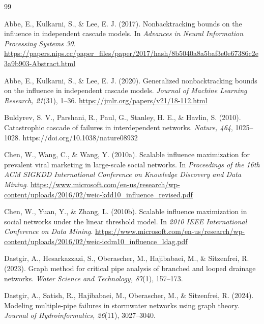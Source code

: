 \renewcommand{\refname}{REFERENCES}
\setlength{\bibsep}{0.5\baselineskip}
\setlength{\bibhang}{1.25cm}

\begin{thebibliography}{99}

Abbe, E., Kulkarni, S., \& Lee, E. J. (2017). Nonbacktracking bounds on the influence in independent cascade models. In \textit{Advances in Neural Information Processing Systems 30}. \url{https://papers.nips.cc/paper_files/paper/2017/hash/8b5040a8a5baf3e0e67386c2e3a9b903-Abstract.html}

Abbe, E., Kulkarni, S., \& Lee, E. J. (2020). Generalized nonbacktracking bounds on the influence in independent cascade models. \textit{Journal of Machine Learning Research, 21}(31), 1--36. \url{https://jmlr.org/papers/v21/18-112.html}

Buldyrev, S. V., Parshani, R., Paul, G., Stanley, H. E., \& Havlin, S. (2010). Catastrophic cascade of failures in interdependent networks. \textit{Nature, 464}, 1025--1028. https://doi.org/10.1038/nature08932

Chen, W., Wang, C., \& Wang, Y. (2010a). Scalable influence maximization for prevalent viral marketing in large-scale social networks. In \textit{Proceedings of the 16th ACM SIGKDD International Conference on Knowledge Discovery and Data Mining}. \url{https://www.microsoft.com/en-us/research/wp-content/uploads/2016/02/weic-kdd10_influence_revised.pdf}

Chen, W., Yuan, Y., \& Zhang, L. (2010b). Scalable influence maximization in social networks under the linear threshold model. In \textit{2010 IEEE International Conference on Data Mining}. \url{https://www.microsoft.com/en-us/research/wp-content/uploads/2016/02/weic-icdm10_influence_ldag.pdf}

Dastgir, A., Hesarkazzazi, S., Oberascher, M., Hajibabaei, M., \& Sitzenfrei, R. (2023). Graph method for critical pipe analysis of branched and looped drainage networks. \textit{Water Science and Technology, 87}(1), 157--173.

Dastgir, A., Satish, R., Hajibabaei, M., Oberascher, M., \& Sitzenfrei, R. (2024). Modeling multiple-pipe failures in stormwater networks using graph theory. \textit{Journal of Hydroinformatics, 26}(11), 3027--3040.


\end{thebibliography}
